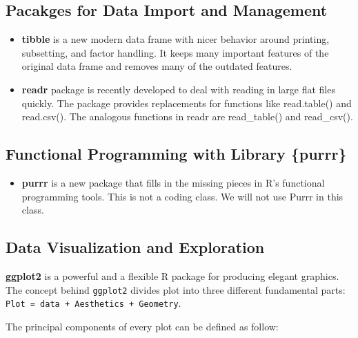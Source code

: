 \documentclass[
]{article}
\providecommand{\tightlist}{%
  \setlength{\itemsep}{0pt}\setlength{\parskip}{0pt}}
\begin{document}
\hypertarget{pacakges-for-data-import-and-management}{%
\subsection{Pacakges for Data Import and
Management}\label{pacakges-for-data-import-and-management}}

\begin{itemize}
\item
  \textbf{tibble} is a new modern data frame with nicer behavior around
  printing, subsetting, and factor handling. It keeps many important
  features of the original data frame and removes many of the outdated
  features.
\item
  \textbf{readr} package is recently developed to deal with reading in
  large flat files quickly. The package provides replacements for
  functions like read.table() and read.csv(). The analogous functions in
  readr are read\_table() and read\_csv().
\end{itemize}

\hypertarget{functional-programming-with-library-purrr}{%
\subsection{\texorpdfstring{Functional Programming with Library
\textbf{\{purrr\}}}{Functional Programming with Library \{purrr\}}}\label{functional-programming-with-library-purrr}}

\begin{itemize}
\tightlist
\item
  \textbf{purrr} is a new package that fills in the missing pieces in
  R's functional programming tools. This is not a coding class. We will
  not use Purrr in this class.
\end{itemize}

\hypertarget{data-visualization-and-exploration}{%
\subsection{Data Visualization and
Exploration}\label{data-visualization-and-exploration}}

\textbf{ggplot2} is a powerful and a flexible R package for producing
elegant graphics. The concept behind \texttt{ggplot2} divides plot into
three different fundamental parts:
\texttt{Plot\ =\ data\ +\ Aesthetics\ +\ Geometry}.

The principal components of every plot can be defined as follow:
\end{document}
